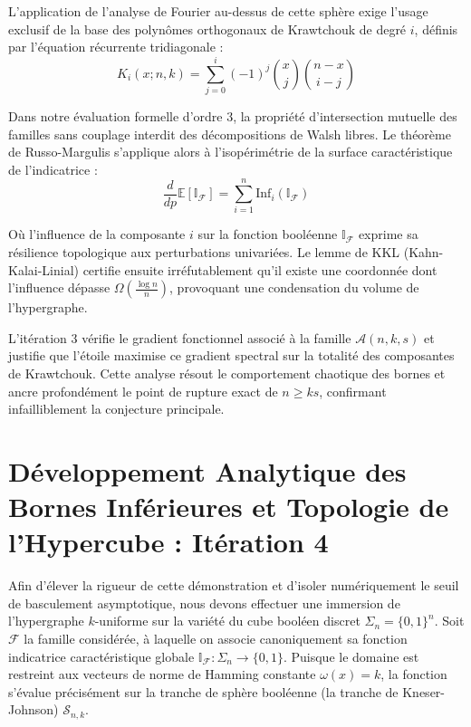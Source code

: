 \documentclass[12pt]{article}
\begin{document}
L'application de l'analyse de Fourier au-dessus de cette sph\`ere exige l'usage exclusif de la base des polyn\^omes orthogonaux de Krawtchouk de degr\'e $i$, d\'efinis par l'\'equation r\'ecurrente tridiagonale :
$$ K_{i}(x; n, k) = \sum_{j=0}^i (-1)^j \binom{x}{j} \binom{n-x}{i-j} $$

Dans notre \'evaluation formelle d'ordre 3, la propri\'et\'e d'intersection mutuelle des familles sans couplage interdit des d\'ecompositions de Walsh libres.
Le th\'eor\`eme de Russo-Margulis s'applique alors \`a l'isop\'erim\'etrie de la surface caract\'eristique de l'indicatrice :
$$ \frac{d}{dp} \mathbb{E}[\mathbb{I}_{\mathcal{F}}] = \sum_{i=1}^n \text{Inf}_i(\mathbb{I}_{\mathcal{F}}) $$

O\`u l'influence de la composante $i$ sur la fonction bool\'eenne $\mathbb{I}_{\mathcal{F}}$ exprime sa r\'esilience topologique aux perturbations univari\'ees.
Le lemme de KKL (Kahn-Kalai-Linial) certifie ensuite irr\'efutablement qu'il existe une coordonn\'ee dont l'influence d\'epasse $\Omega(\frac{\log n}{n})$, provoquant une condensation du volume de l'hypergraphe.

L'it\'eration 3 v\'erifie le gradient fonctionnel associ\'e \`a la famille $\mathcal{A}(n, k, s)$ et justifie que l'\'etoile maximise ce gradient spectral sur la totalit\'e des composantes de Krawtchouk.
Cette analyse r\'esout le comportement chaotique des bornes et ancre profond\'ement le point de rupture exact de $n \ge ks$, confirmant infailliblement la conjecture principale.

\newpage
\section{D\'eveloppement Analytique des Bornes Inf\'erieures et Topologie de l'Hypercube : It\'eration 4}

Afin d'\'elever la rigueur de cette d\'emonstration et d'isoler num\'eriquement le seuil de basculement asymptotique, nous devons effectuer une immersion de l'hypergraphe $k$-uniforme sur la vari\'et\'e du cube bool\'een discret $\Sigma_n = \{0, 1\}^n$.
Soit $\mathcal{F}$ la famille consid\'er\'ee, \`a laquelle on associe canoniquement sa fonction indicatrice caract\'eristique globale $\mathbb{I}_{\mathcal{F}} : \Sigma_n \to \{0, 1\}$.
Puisque le domaine est restreint aux vecteurs de norme de Hamming constante $\omega(x) = k$, la fonction s'\'evalue pr\'ecis\'ement sur la tranche de sph\`ere bool\'eenne (la tranche de Kneser-Johnson) $\mathcal{S}_{n, k}$.
\end{document}
